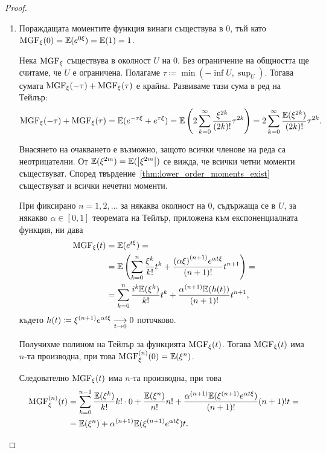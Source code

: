 \documentclass[numbers=endperiod, bibliography=totocnumbered]{scrartcl}
\begin{document}
\begin{proof}
  \mbox{}
  \begin{enumerate}
    \item Пораждащата моментите функция винаги съществува в \( 0 \), тъй като \( \MGF_\xi(0) = \Expect(e^{0\xi}) = \Expect(1) = 1 \).

    Нека \( \MGF_\xi \) съществува в околност \( U \) на \( 0 \). Без ограничение на общността ще считаме, че \( U \) е ограничена. Полагаме \( \tau \coloneqq \min(-\inf U, \sup_U) \). Тогава сумата \( \MGF_\xi(-\tau) + \MGF_\xi(\tau) \) е крайна. Развиваме тази сума в ред на Тейлър:
    \begin{align*}
      \MGF_\xi(-\tau) + \MGF_\xi(\tau)
      =
      \Expect(e^{-\tau\xi} + e^{\tau\xi})
      =
      \Expect\left( 2 \sum_{k=0}^\infty \frac {\xi^{2k}} {(2k)!} \tau^{2k} \right)
      =
      2 \sum_{k=0}^\infty \frac {\Expect(\xi^{2k})} {(2k)!} \tau^{2k}.
    \end{align*}

    Внасянето на очакването е възможно, защото всички членове на реда са неотрицателни. От \( \Expect(\xi^{2m}) = \Expect(\Abs{\xi^{2m}}) \) се вижда, че всички четни моменти съществуват. Според твърдение~\ref{thm:lower_order_moments_exist} съществуват и всички нечетни моменти.

    При фиксирано \( n = 1, 2, \ldots \) за някаква околност на \( 0 \), съдържаща се в \( U \), за някакво \( \alpha \in [0, 1] \) теоремата на Тейлър, приложена към експоненциалната функция, ни дава
    \begin{align*}
      \MGF_\xi(t)
      &=
      \Expect(e^{t\xi})
      = \\ &=
      \Expect\left(\sum_{k=0}^n \frac {\xi^k} {k!} t^k + \frac {{(\alpha \xi)}^{(n+1)} e^{\alpha t \xi}} {(n+1)!} t^{n+1} \right)
      = \\ &=
      \sum_{k=0}^n \frac {i^k \Expect(\xi^k)} {k!} t^k + \frac {{\alpha}^{(n+1)} \Expect(h(t))} {(n+1)!} t^{n+1},
    \end{align*}
    където \( h(t) \coloneqq \xi^{(n+1)} e^{\alpha t \xi} \Conv[t \to 0]{} 0 \) поточково.

    Получихме полином на Тейлър за функцията \( \MGF_\xi(t) \). Тогава \( \MGF_\xi(t) \) има \( n \)-та производна, при това \( \MGF^{(n)}_\xi(0) = \Expect(\xi^n) \).

    Следователно \( \MGF_\xi(t) \) има \( n \)-та производна, при това
    \begin{align*}
      \MGF^{(n)}_\xi(t)
      &=
      \sum_{k=0}^{n-1} \frac {\Expect(\xi^k)} {k!} k! \cdot 0 + \frac {\Expect(\xi^n)} {n!} n! + \frac {\alpha^{(n+1)} \Expect(\xi^{(n+1)} e^{\alpha t \xi})} {(n+1)!} (n+1)! t
      = \\ &=
      \Expect(\xi^n) + \alpha^{(n+1)} \Expect(\xi^{(n+1)} e^{\alpha t \xi}) t.
    \end{align*}


\end{enumerate}
\end{proof}
\end{document}
